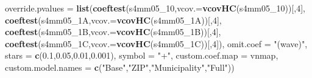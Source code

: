 \documentclass[
]{article}
\newenvironment{Shaded}{\begin{snugshade}}{\end{snugshade}}
\newcommand{\DataTypeTok}[1]{\textcolor[rgb]{0.13,0.29,0.53}{#1}}
\newcommand{\DecValTok}[1]{\textcolor[rgb]{0.00,0.00,0.81}{#1}}
\newcommand{\FloatTok}[1]{\textcolor[rgb]{0.00,0.00,0.81}{#1}}
\newcommand{\KeywordTok}[1]{\textcolor[rgb]{0.13,0.29,0.53}{\textbf{#1}}}
\newcommand{\NormalTok}[1]{#1}
\newcommand{\StringTok}[1]{\textcolor[rgb]{0.31,0.60,0.02}{#1}}
\begin{document}
\begin{Shaded}
\begin{Highlighting}[]
          \DataTypeTok{override.pvalues =} \KeywordTok{list}\NormalTok{(}\KeywordTok{coeftest}\NormalTok{(s4mm05_}\DecValTok{10}\NormalTok{,}\DataTypeTok{vcov.=}\KeywordTok{vcovHC}\NormalTok{(s4mm05_}\DecValTok{10}\NormalTok{))[,}\DecValTok{4}\NormalTok{],}
                                  \KeywordTok{coeftest}\NormalTok{(s4mm05_1A,}\DataTypeTok{vcov.=}\KeywordTok{vcovHC}\NormalTok{(s4mm05_1A))[,}\DecValTok{4}\NormalTok{],}
                                  \KeywordTok{coeftest}\NormalTok{(s4mm05_1B,}\DataTypeTok{vcov.=}\KeywordTok{vcovHC}\NormalTok{(s4mm05_1B))[,}\DecValTok{4}\NormalTok{],}
                                  \KeywordTok{coeftest}\NormalTok{(s4mm05_1C,}\DataTypeTok{vcov.=}\KeywordTok{vcovHC}\NormalTok{(s4mm05_1C))[,}\DecValTok{4}\NormalTok{]),}
          \DataTypeTok{omit.coef =} \StringTok{"(wave)"}\NormalTok{, }\DataTypeTok{stars =} \KeywordTok{c}\NormalTok{(}\FloatTok{0.1}\NormalTok{,}\FloatTok{0.05}\NormalTok{,}\FloatTok{0.01}\NormalTok{,}\FloatTok{0.001}\NormalTok{), }\DataTypeTok{symbol =} \StringTok{"+"}\NormalTok{,}
          \DataTypeTok{custom.coef.map =}\NormalTok{ vnmap, }
          \DataTypeTok{custom.model.names =} \KeywordTok{c}\NormalTok{(}\StringTok{"Base"}\NormalTok{,}\StringTok{"ZIP"}\NormalTok{,}\StringTok{"Municipality"}\NormalTok{,}\StringTok{"Full"}\NormalTok{))}
\end{Highlighting}
\end{Shaded}
\end{document}
